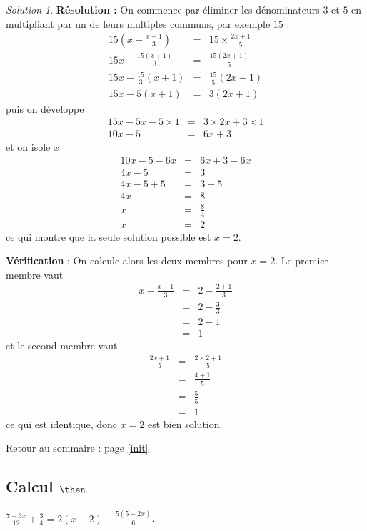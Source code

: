 \documentclass[14pt]{article}
\theoremstyle{remark}
\newtheorem*{sol}{Solution}
\newcounter{n}
\renewcommand{\it}{Retour au sommaire : page \ref{init}
	\subsection{Calcul $ \mathbf{ \then}.$}\label{\then} \stepcounter{n} }
\theoremstyle{plain}
\begin{document}
\begin{sol}
\textbf{Résolution :} On commence par éliminer les dénominateurs $3$ et $5$ en multipliant par un de leurs multiples communs, par exemple $15$ : 
\begin{eqnarray*}
15\left(x-\frac{x+1}3\right) &=& 15\times \frac{2x+1}5\\
15x -\frac{15(x+1)}3 &=& \frac{15(2x+1)}5 \\
15x - \frac{15}3(x+1)&=& \frac{15}5(2x+1) \\
15x - 5(x+1) &=& 3(2x+1)
\end{eqnarray*} puis on développe
\begin{eqnarray*} 
15x - 5x-5\times 1 &=& 3\times 2x+3\times 1\\
10x - 5 &=& 6x+3
\end{eqnarray*}et on isole $x$
\begin{eqnarray*}
10x-5-6x &=& 6x+3-6x \\
4x-5 &=& 3 \\
4x-5+5 &=& 3+5 \\
4x &=&8 \\
x &=& \frac84\\
x&=&2
\end{eqnarray*}
ce qui montre que la seule solution possible est $x=2$. 

\textbf{Vérification} : On calcule alors les deux membres pour $x=2$. Le premier membre vaut 
\begin{eqnarray*}x-\frac{x+1}3&=& 2-\frac{2+1}3\\
&=& 
2-\frac33 \\&=& 2-1 \\ &=&1
\end{eqnarray*}
et le second membre vaut 
\begin{eqnarray*}\frac{2x+1}5 &=& \frac{2\times 2+1}5 \\
&=& \frac{4+1}5\\
&=&\frac55\\
&=& 1
\end{eqnarray*} ce qui est identique, donc $x=2$ est bien solution.
\end{sol}
\it $\frac{7-3x}{12} + \frac34 = 2(x-2) + \frac{5(5-2x)}6$. 
\end{document}
